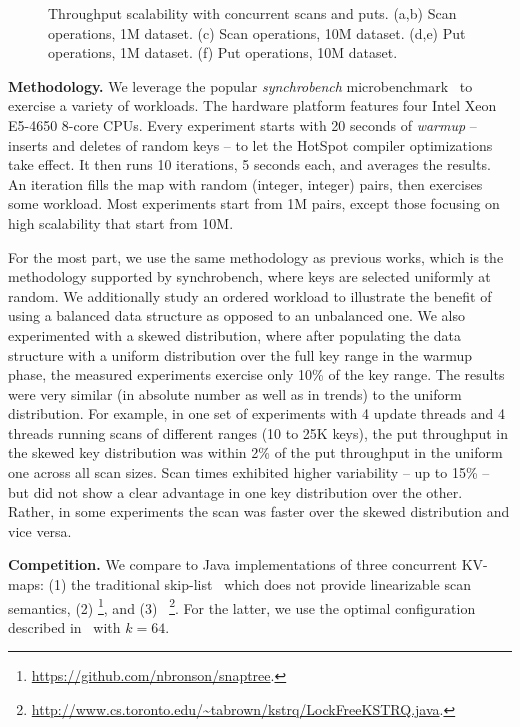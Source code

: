 \begin{figure*}
\begin{center}

\end{center}
\caption{Throughput scalability with concurrent scans and puts. (a,b) Scan operations, 1M dataset. 
(c) Scan operations, 10M dataset. (d,e) Put operations, 1M dataset. (f) Put operations, 10M dataset.  }
\label{evaluation:results:scan}
\end{figure*}

\textbf{Methodology.}
We leverage the popular {\em synchrobench}  microbenchmark~\cite{Gramoli2015}
to exercise a variety of workloads. The hardware platform 
features four Intel Xeon E5-4650 8-core CPUs. %
Every experiment starts with 20 seconds of {\em warmup} -- inserts
and deletes of random keys -- to let the HotSpot compiler optimizations take effect. 
It then runs 10  iterations, 5 seconds each, and averages the results. An iteration fills the map with 
random (integer, integer) pairs, then exercises some workload. 
Most experiments start from 1M pairs, except those focusing on high scalability that start from 10M.

For the most part, we use the same methodology as previous works, which is the methodology supported by synchrobench, where keys are selected uniformly at random. 
We additionally study an ordered workload to illustrate the benefit of using a balanced data structure as opposed to an unbalanced one. 
We also experimented with a skewed distribution, where after populating the data structure with a uniform distribution over the full key range in the warmup phase, the measured experiments exercise only 10\% of the key range. The results were very similar (in absolute number as well as in trends) to the uniform distribution. For example, in one set of experiments with 4 update threads and 4 threads running scans of different ranges (10 to 25K keys), the put throughput in the skewed key distribution was within 2\% of the put throughput in the uniform one across all scan sizes. Scan times exhibited higher variability -- up to 15\% -- but did not show a clear advantage in one key distribution over the other. Rather, in some experiments the scan was faster over the skewed distribution and vice versa. 

\textbf{Competition.}
We compare {\kiwi} to Java implementations of three concurrent KV-maps: (1) the traditional 
skip-list~\cite{JavaConcurrentSkipList} which does not provide linearizable scan semantics, 
(2) {\snaptree}\cite{BronsonCCO2010}\footnote{\small{\url{https://github.com/nbronson/snaptree}}.}, 
and (3) {\kary}~\cite{BrownA12}\footnote{\small{\url{http://www.cs.toronto.edu/~tabrown/kstrq/LockFreeKSTRQ.java}}.}. 
For the latter, we use the optimal configuration described in~\cite{BrownA12} with $k=64$. 

